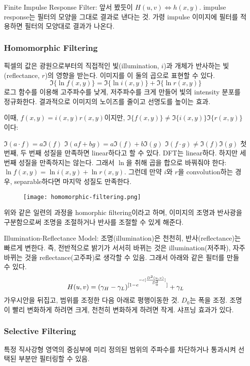 Finite Impulse Response Filter: 앞서 봤듯이 $H(u, v) \Leftrightarrow h(x, y)$. impulse response는 필터의 모양을 그대로 결과로 낸다는 것. 가령 impulse 이미지에 필터를 적용하면 필터의 모양대로 결과가 나온다.

\subsubsection{Homomorphic Filtering}

픽셀의 값은 광원으로부터의 직접적인 빛(illumination, $i$)과 개체가 반사하는 빛(reflectance, $r$)의 영향을 받는다. 이미지를 이 둘의 곱으로 표현할 수 있다.
$$\Im\{\ln f(x, y)\} = \Im\{\ln i(x, y)\} + \Im\{\ln r(x, y)\}$$
로그 함수를 이용해 고주파수를 낮게, 저주파수를 크게 만들어 빛의 intensity 분포를 정규화한다. 결과적으로 이미지의 노이즈를 줄이고 선명도를 높이는 효과.

이때, $f(x, y) = i(x, y) r(x, y)$이지만, $\Im\{f(x, y)\} \neq \Im\{i(x, y)\} \Im\{r(x, y)\}$이다:

\bitmz
  \itm $\Im(a \cdot f) = a\Im(f)$
  \itm $\Im(af + bg) = a\Im(f) + b\Im(g)$
  \itm $\Im(f \cdot g) \neq \Im(f)\Im(g)$
\eitmz
첫 번째, 두 번째 성질을 만족하면 linear하다고 할 수 있다. DFT는 linear하다. 하지만 세 번째 성질을 만족하지는 않는다. 그래서 $\ln$을 취해 곱을 합으로 바꿔줘야 한다: $\ln f(x, y) = \ln i(x, y) + \ln r(x, y)$. 그런데 만약 $i$와 $r$을 convolution하는 경우, separable하다면 마지막 성질도 만족한다.

\begin{figure}[h]
  \centering
  \texttt{[image: homomorphic-filtering.png]}
\end{figure}

위와 같은 일련의 과정을 homorphic filtering이라고 하며, 이미지의 조명과 반사광을 구분함으로써 조명을 조절하거나 반사를 조절할 수 있게 해준다.

Illumination-Reflectance Model: 조명(illumination)은 천천히, 반사(reflectance)는 빠르게 변한다. 즉, 전반적으로 밝기가 서서히 바뀌는 것은 illumination(저주파), 자주 바뀌는 것을 reflectance(고주파)로 생각할 수 있음. 그래서 아래와 같은 필터를 만들 수 있다.
$$H(u, v) = (\gamma_H - \gamma_L)^{[1 - e^{-c [{D^2(u, v) \over D_0^2}]}]} + \gamma_L$$
가우시안을 뒤집고, 범위를 조정한 다음 아래로 평행이동한 것. $D_0$는 폭을 조정. 조명이 빨리 변화하게 하려면 크게, 천천히 변화하게 하려면 작게. 샤프닝 효과가 있다.

\subsubsection{Selective Filtering}

특정 직사강형 영역의 중심부에 미리 정의된 범위의 주파수를 차단하거나 통과시켜 선택된 부분만 필터링할 수 있음.

